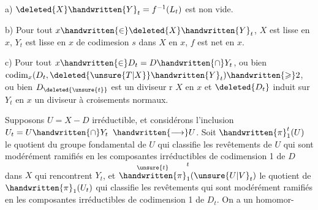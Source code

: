 a)  $\deleted{X}\handwritten{Y}_t=f^{-1}(L_t)$ est non vide.

b) Pour tout $x\handwritten{\in}\deleted{X}\handwritten{Y}_t$, $X$ est lisse en $x$, $Y_t$ est lisse en $x$\handwritten{,} de
codimesion $s$ dans $X$ en $x$, $f$ est net en $x$.

c) Pour tout $x\handwritten{\in}D_t=D\handwritten{\cap}Y_t$, o\deleted{\`{}}u  bien $\operatorname{codim}_x(D_t,\deleted{\unsure{T|X}}\handwritten{Y}_t)\handwritten{\geqslant}2$, ou bien
$D_{\deleted{\unsure{t}}}$ est un diviseur r $X$ en $x$ et $\deleted{D_t}$ induit sur $Y_t$ en $x$ un diviseur
à croisements normaux.

Supposons $U=X-D$ irréductible, et considérons l'inclusion $U_t=U\handwritten{\cap}Y_t$
$\handwritten{\longrightarrow}U$.  Soit $\handwritten{\pi}_1^t(U)$ le  quotient du groupe fondamental de
$U$  qui classifie les revêtements de $U$ qui sont modérément
ramifiés en les composantes irréductibles de codimension 1 de $D$ dans $X$
qui rencontrent $Y_t$,  et $\overset{\unsure{t}}{\handwritten{\pi}}_1^t(\unsure{U|V}_t)$ le quotient  de
$\handwritten{\pi}_1(U_t)$ qui classifie les revêtements qui sont modérément ramifiés en
les composantes irréductibles de codimension 1 de $D_t$. On a un homomor-%
